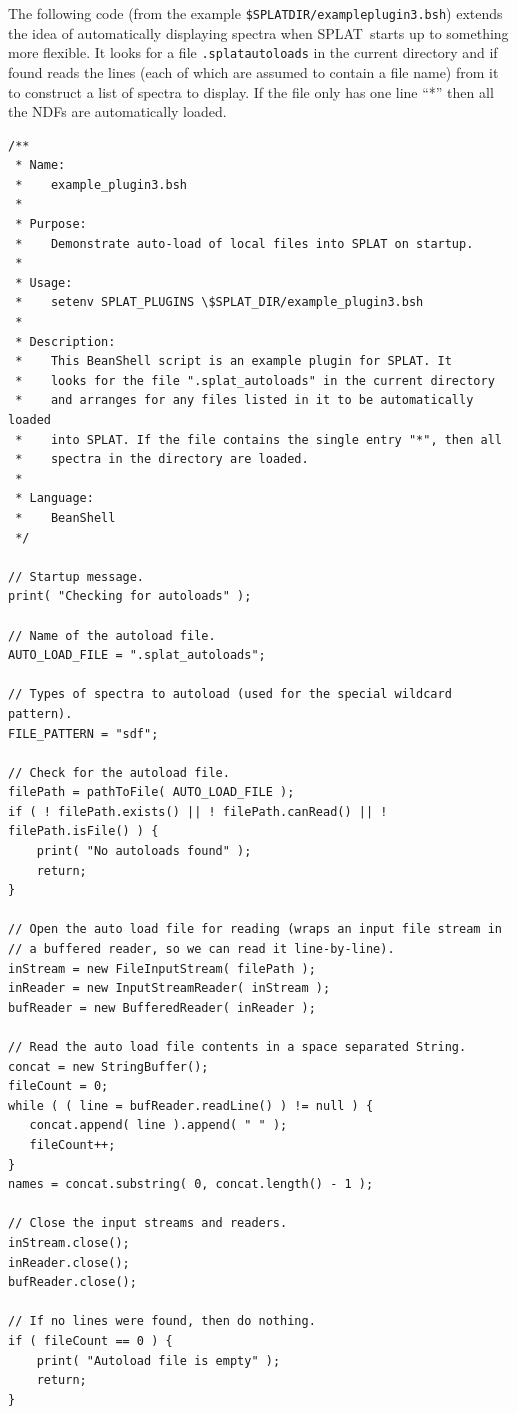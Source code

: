 \documentclass[twoside,11pt]{article}
\renewcommand{\_}{\texttt{\symbol{95}}}
\newcommand{\SPLAT}{\textsf{SPLAT}}
\newcommand{\hitext}[1]{\texttt{#1}}
\newcommand{\exampleheading}[1]
{\begin{center}
  \fbox{#1}
 \end{center}
}
\begin{document}
The following code (from the example
\hitext{\$SPLAT\_DIR/example\_plugin3.bsh}) extends the idea of
automatically displaying spectra when \SPLAT\ starts up to something
more flexible. It looks for a file \hitext{.splat\_autoloads} in the
current directory and if found reads the lines (each of which are
assumed to contain a file name) from it to construct a list of spectra
to display. If the file only has one line ``*'' then all the NDFs are
automatically loaded.

\exampleheading{Example spectral auto-loading}

\begin{verbatim}
/**
 * Name:
 *    example_plugin3.bsh
 *
 * Purpose:
 *    Demonstrate auto-load of local files into SPLAT on startup.
 *
 * Usage:
 *    setenv SPLAT_PLUGINS \$SPLAT_DIR/example_plugin3.bsh
 *
 * Description:
 *    This BeanShell script is an example plugin for SPLAT. It
 *    looks for the file ".splat_autoloads" in the current directory
 *    and arranges for any files listed in it to be automatically loaded
 *    into SPLAT. If the file contains the single entry "*", then all
 *    spectra in the directory are loaded.
 *
 * Language:
 *    BeanShell
 */

// Startup message.
print( "Checking for autoloads" );

// Name of the autoload file.
AUTO_LOAD_FILE = ".splat_autoloads";

// Types of spectra to autoload (used for the special wildcard pattern).
FILE_PATTERN = "sdf";

// Check for the autoload file.
filePath = pathToFile( AUTO_LOAD_FILE );
if ( ! filePath.exists() || ! filePath.canRead() || ! filePath.isFile() ) {
    print( "No autoloads found" );
    return;
}

// Open the auto load file for reading (wraps an input file stream in
// a buffered reader, so we can read it line-by-line).
inStream = new FileInputStream( filePath );
inReader = new InputStreamReader( inStream );
bufReader = new BufferedReader( inReader );

// Read the auto load file contents in a space separated String.
concat = new StringBuffer();
fileCount = 0;
while ( ( line = bufReader.readLine() ) != null ) {
   concat.append( line ).append( " " );
   fileCount++;
}
names = concat.substring( 0, concat.length() - 1 );

// Close the input streams and readers.
inStream.close();
inReader.close();
bufReader.close();

// If no lines were found, then do nothing.
if ( fileCount == 0 ) {
    print( "Autoload file is empty" );
    return;
}


\end{verbatim}
\end{document}
